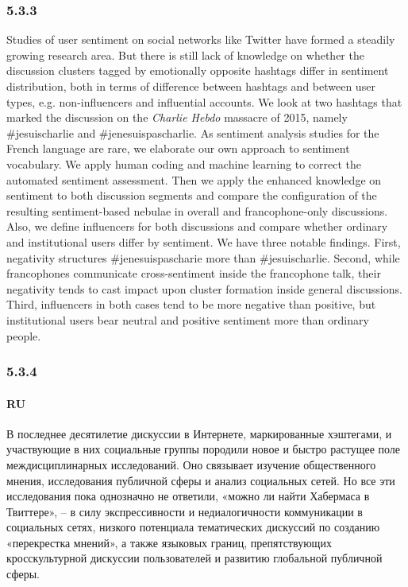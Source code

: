 \subsubsection{5.3.3}

Studies of user sentiment on social networks like Twitter have formed a steadily growing research area. But there is still lack of knowledge on whether the discussion clusters tagged by emotionally opposite hashtags differ in sentiment distribution, both in terms of difference between hashtags and between user types, e.g. non-influencers and influential accounts. We look at two hashtags that marked the discussion on the \textit{Charlie Hebdo} massacre of 2015, namely \#jesuischarlie and \#jenesuispascharlie. As sentiment analysis studies for the French language are rare, we elaborate our own approach to sentiment vocabulary. We apply human coding and machine learning to correct the automated sentiment assessment. Then we apply the enhanced knowledge on sentiment to both discussion segments and compare the configuration of the resulting sentiment-based nebulae in overall and francophone-only discussions. Also, we define influencers for both discussions and compare whether ordinary and institutional users differ by sentiment. We have three notable findings. First, negativity structures \#jenesuispascharie more than \#jesuischarlie. Second, while francophones communicate cross-sentiment inside the francophone talk, their negativity tends to cast impact upon cluster formation inside general discussions. Third, influencers in both cases tend to be more negative than positive, but institutional users bear neutral and positive sentiment more than ordinary people.

\subsubsection{5.3.4}

\paragraph{RU} В последнее десятилетие дискуссии в Интернете, маркированные хэштегами, и участвующие в них социальные группы породили новое и  быстро растущее поле междисциплинарных исследований. Оно связывает изучение общественного мнения, исследования публичной сферы и анализ социальных сетей. Но все эти исследования пока однозначно не ответили, «можно ли найти Хабермаса в Твиттере», -- в силу экспрессивности и недиалогичности коммуникации в социальных сетях, низкого потенциала тематических дискуссий по созданию «перекрестка мнений», а  также языковых границ, препятствующих кросскультурной дискуссии пользователей и  развитию глобальной публичной сферы.

